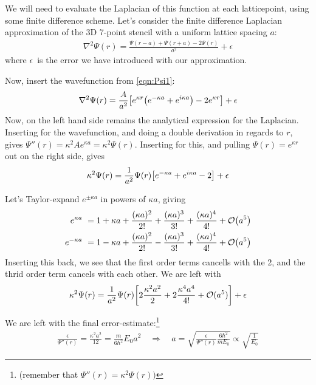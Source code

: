 \documentclass[12p,a4paper]{article}
\renewcommand{\exp}{e^}
\renewcommand{\exp}{e^}
\begin{document}
We will need to evaluate the Laplacian of this function at each latticepoint, using some finite difference scheme. Let's consider the finite difference Laplacian approximation of the 3D 7-point stencil with a uniform lattice spacing $a$:
\begin{align}
    \nabla^2 \Psi(r) = \frac{\Psi(r-a) + \Psi(r+a) - 2\Psi(r)}{a^2} + \epsilon
\end{align}
where $\epsilon$ is the error we have introduced with our approximation.

Now, insert the wavefunction from \ref{eqn:Psi1}:
\begin{align}
    \nabla^2 \Psi(r) = \frac{A}{a^2}\qty[\exp{\kappa r}\qty(\exp{-\kappa a} + \exp{i\kappa a}) - 2\exp{\kappa r}] + \epsilon
\end{align}
Now, on the left hand side remains the analytical expression for the Laplacian. Inserting for the wavefunction, and doing a double derivation in regards to $r$, gives $\Psi''(r) = \kappa^2A\exp{\kappa a} = \kappa^2\Psi(r)$. Inserting for this, and pulling $\Psi(r) = \exp{\kappa r}$ out on the right side, gives
\begin{align}
    \kappa^2 \Psi(r) = \frac{1}{a^2}\Psi(r)\qty[\exp{-\kappa a} + \exp{i\kappa a} - 2] + \epsilon
\end{align}

Let's Taylor-expand $\exp{\pm\kappa a}$ in powers of $\kappa a$, giving
\begin{align*}
    \exp{\kappa a} = 1 + \kappa a + \frac{(\kappa a)^2}{2!} + \frac{(\kappa a)^3}{3!} + \frac{(\kappa a)^4}{4!} + \mathcal{O}{\qty(a^5)} \\
    \exp{-\kappa a} = 1 - \kappa a + \frac{(\kappa a)^2}{2!} - \frac{(\kappa a)^3}{3!} + \frac{(\kappa a)^4}{4!} + \mathcal{O}{\qty(a^5)}
\end{align*}
Inserting this back, we see that the first order terms cancells with the 2, and the thrid order term cancels with each other. We are left with
\begin{align}
    \kappa^2 \Psi(r) = \frac{1}{a^2}\Psi(r)\qty[2\frac{\kappa^2a^2}{2} + 2\frac{\kappa^4a^4}{4!} + \mathcal{O}(a^5)] + \epsilon
\end{align}

We are left with the final error-estimate:\footnote{(remember that $\Psi''(r) = \kappa^2\Psi(r))$}
\begin{align}
    \frac{\epsilon}{\Psi''(r)} = \frac{\kappa^2a^2}{12} = \frac{m}{6\hbar^2}E_0a^2 \quad \Rightarrow \quad a = \sqrt{\frac{\epsilon}{\Psi''(r)} \frac{6\hbar^2}{mE_0}} \propto \sqrt{\frac{1}{E_0}}
\end{align}
\end{document}
